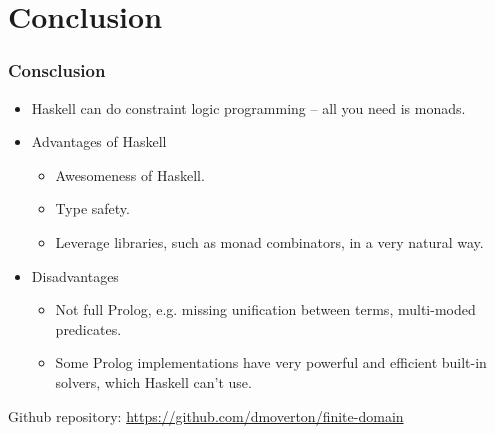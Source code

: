 \documentclass[aspectratio=169,hyphens]{beamer} %
\begin{document}
\section{Conclusion}
\begin{frame}
    \frametitle{Consclusion}
    \begin{itemize}
        \item Haskell can do constraint logic programming -- all you need is monads.
            \pause
        \item Advantages of Haskell
            \begin{itemize}
                    \pause
                \item Awesomeness of Haskell.
                    \pause
                \item Type safety.
                    \pause
                \item Leverage libraries, such as monad combinators, in a very natural way.
                    \pause
            \end{itemize}
        \item Disadvantages
            \begin{itemize}
                    \pause
                \item Not full Prolog, e.g. missing unification between terms, multi-moded predicates.
                    \pause
                \item Some Prolog implementations have very powerful and efficient built-in solvers, which Haskell can't use.
            \end{itemize}
    \end{itemize}
    \pause
    Github repository: \url{https://github.com/dmoverton/finite-domain}
\end{frame}
\end{document}
